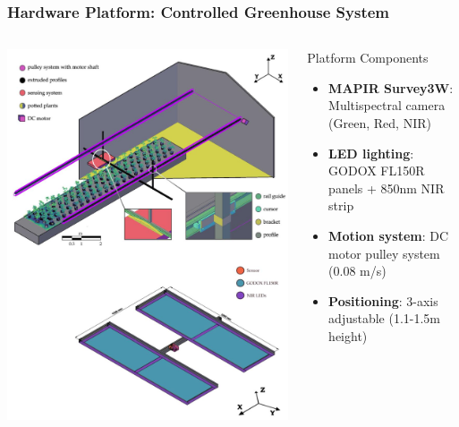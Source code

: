 \documentclass[aspectratio=43]{beamer}
\begin{document}
\begin{frame}
    \frametitle{Hardware Platform: Controlled Greenhouse System}
    
    \begin{columns}
        \begin{column}{0.5\textwidth}
            \includegraphics[width=\textwidth]{Imgs/agronomy-14-00306-g001.png}
        \end{column}
        
        \begin{column}{0.5\textwidth}
            \begin{block}{Platform Components}
                \scriptsize
                \begin{itemize}
                    \item \textbf{MAPIR Survey3W}: Multispectral camera (Green, Red, NIR)
                    \item \textbf{LED lighting}: GODOX FL150R panels + 850nm NIR strip
                    \item \textbf{Motion system}: DC motor pulley system (0.08 m/s)
                    \item \textbf{Positioning}: 3-axis adjustable (1.1-1.5m height)
                \end{itemize}
            \end{block}
            

\end{column}
\end{columns}
\end{frame}
\end{document}
